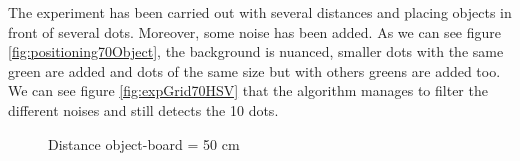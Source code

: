 The experiment has been carried out with several distances and placing objects in front of several dots. Moreover, some noise has been added. As we can see figure \ref{fig:positioning70Object}, the background is nuanced, smaller dots with the same green are added and dots of the same size but with others greens are added too. We can see figure \ref{fig:expGrid70HSV} that the algorithm manages to filter the different noises and still detects the 10 dots.



\begin{figure}[!h] 
\centering
{}
\quad 
{}
\caption{Distance object-board = 50 cm}
\end{figure}

